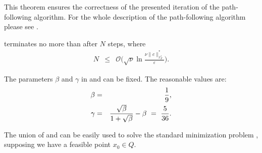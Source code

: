 This theorem ensures the correctness of the presented iteration of the path-following algorithm.
For the whole description of the path-following algorithm please see .



\begin{theorem}
   terminates no more than after $N$ steps, where
  \begin{eqnarray}
    N &\leq& \mathcal{O}\Bigg(\sqrt{\nu}\ln\frac{\nu \|c\|^*_{x^*_F}}{\varepsilon}\Bigg).
  \end{eqnarray}
\end{theorem}

The parameters $\beta$ and $\gamma$ in  and  can be fixed. The reasonable values are:
\begin{eqnarray}
  \beta &=& \frac{1}{9},\labeleq{SDP:scb:beta}\\
  \gamma &=& \frac{\sqrt{\beta}}{1+\sqrt{\beta}} - \beta\ =\ \frac{5}{36}.\labeleq{SDP:scb:gamma}
\end{eqnarray}

The union of  and  can be easily used to solve the standard minimization problem , supposing we have a feasible point $x_0\in Q$.

